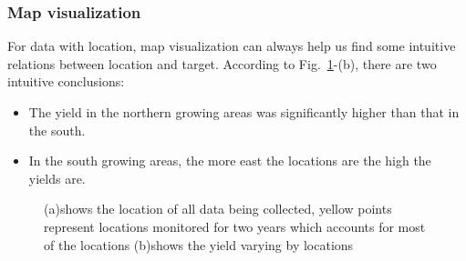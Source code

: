 \documentclass[conference, a4paper]{IEEEtran}
\begin{document}
  \subsubsection{Map visualization}
  For data with location, map visualization can always help us find some intuitive relations between location and target. According to Fig.~\ref{fig:Map_visual}-(b), there are two intuitive conclusions:
  \begin{itemize}
      \item The yield in the northern growing areas was significantly higher than that in the south. 
      \item In the south growing areas, the more east the locations are the high the yields are.
  \end{itemize}

  \begin{figure}[htb]
      \centering
      \hfill
    \caption{(a)shows the location of all data being collected, yellow points represent locations monitored for two years which accounts for most of the locations (b)shows the yield varying by locations}
    \label{fig:Map_visual}
  \end{figure}
\end{document}
